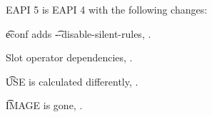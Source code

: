EAPI 5 is EAPI 4 with the following changes:

\begin{compactitem}
\item \t{econf} adds \t{-{}-disable-silent-rules}, .
\item Slot operator dependencies, .
\item \t{USE} is calculated differently, .
\item \t{IMAGE} is gone, .
\end{compactitem}



